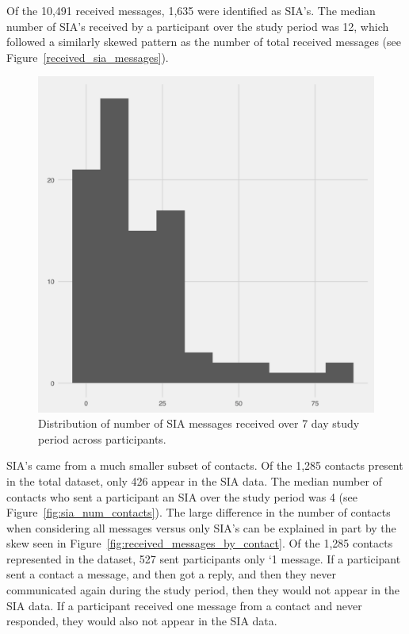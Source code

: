 \documentclass[12pt]{nuthesis}	%
\begin{document}
Of the 10,491 received messages, 1,635 were identified as SIA's. The median number of SIA's received by a participant over the study period was 12, which followed a similarly skewed pattern as the number of total received messages (see Figure~\ref{received_sia_messages}).

\begin{figure}[h]
\centering
\includegraphics[width=.7\textwidth]{figures/sia_received_distribution}
\caption{Distribution of number of SIA messages received over 7 day study period across participants.}
\label{fig:received_sia_messages}
\end{figure}

SIA's came from a much smaller subset of contacts. Of the 1,285 contacts present in the total dataset, only 426 appear in the SIA data. The median number of contacts who sent a participant an SIA over the study period was 4 (see Figure~\ref{fig:sia_num_contacts}). The large difference in the number of contacts when considering all messages versus only SIA's can be explained in part by the skew seen in Figure~\ref{fig:received_messages_by_contact}. Of the 1,285 contacts represented in the dataset, 527 sent participants only `1 message. If a participant sent a contact a message, and then got a reply, and then they never communicated again during the study period, then they would not appear in the SIA data. If a participant received one message from a contact and never responded, they would also not appear in the SIA data.
\end{document}
